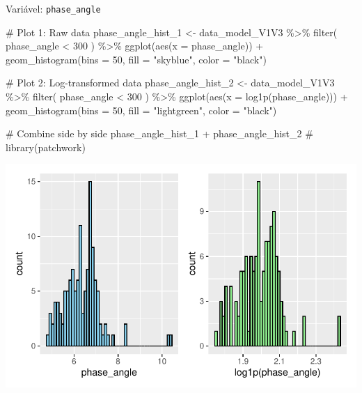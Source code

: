 \documentclass[
  12pt,
]{article}
\newenvironment{Shaded}{\begin{snugshade}}{\end{snugshade}}
\newcommand{\AttributeTok}[1]{\textcolor[rgb]{0.40,0.45,0.13}{#1}}
\newcommand{\CommentTok}[1]{\textcolor[rgb]{0.37,0.37,0.37}{#1}}
\newcommand{\DecValTok}[1]{\textcolor[rgb]{0.68,0.00,0.00}{#1}}
\newcommand{\FunctionTok}[1]{\textcolor[rgb]{0.28,0.35,0.67}{#1}}
\newcommand{\NormalTok}[1]{\textcolor[rgb]{0.00,0.23,0.31}{#1}}
\newcommand{\OtherTok}[1]{\textcolor[rgb]{0.00,0.23,0.31}{#1}}
\newcommand{\SpecialCharTok}[1]{\textcolor[rgb]{0.37,0.37,0.37}{#1}}
\newcommand{\StringTok}[1]{\textcolor[rgb]{0.13,0.47,0.30}{#1}}
\begin{document}
Variável: \texttt{phase\_angle}

\begin{Shaded}
\begin{Highlighting}[]
\CommentTok{\# Plot 1: Raw data}
\NormalTok{phase\_angle\_hist\_1 }\OtherTok{\textless{}{-}}\NormalTok{ data\_model\_V1V3 }\SpecialCharTok{\%\textgreater{}\%} 
    \FunctionTok{filter}\NormalTok{(}
\NormalTok{        phase\_angle }\SpecialCharTok{\textless{}} \DecValTok{300}
\NormalTok{    ) }\SpecialCharTok{\%\textgreater{}\%} 
    \FunctionTok{ggplot}\NormalTok{(}\FunctionTok{aes}\NormalTok{(}\AttributeTok{x =}\NormalTok{ phase\_angle)) }\SpecialCharTok{+} 
    \FunctionTok{geom\_histogram}\NormalTok{(}\AttributeTok{bins =} \DecValTok{50}\NormalTok{, }\AttributeTok{fill =} \StringTok{"skyblue"}\NormalTok{, }\AttributeTok{color =} \StringTok{"black"}\NormalTok{)}

\CommentTok{\# Plot 2: Log{-}transformed data}
\NormalTok{phase\_angle\_hist\_2 }\OtherTok{\textless{}{-}}\NormalTok{ data\_model\_V1V3 }\SpecialCharTok{\%\textgreater{}\%} 
    \FunctionTok{filter}\NormalTok{(}
\NormalTok{        phase\_angle }\SpecialCharTok{\textless{}} \DecValTok{300}
\NormalTok{    ) }\SpecialCharTok{\%\textgreater{}\%}
    \FunctionTok{ggplot}\NormalTok{(}\FunctionTok{aes}\NormalTok{(}\AttributeTok{x =} \FunctionTok{log1p}\NormalTok{(phase\_angle))) }\SpecialCharTok{+} 
    \FunctionTok{geom\_histogram}\NormalTok{(}\AttributeTok{bins =} \DecValTok{50}\NormalTok{, }\AttributeTok{fill =} \StringTok{"lightgreen"}\NormalTok{, }\AttributeTok{color =} \StringTok{"black"}\NormalTok{)}

\CommentTok{\# Combine side by side}
\NormalTok{phase\_angle\_hist\_1 }\SpecialCharTok{+}\NormalTok{ phase\_angle\_hist\_2 }\CommentTok{\# library(patchwork)}
\end{Highlighting}
\end{Shaded}

\includegraphics{Outcomes_files/figure-pdf/phase_angle_1-1.pdf}
\end{document}

